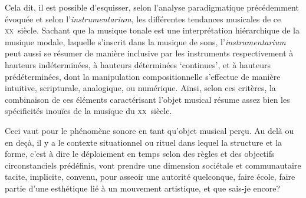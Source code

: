\documentclass{article}
\begin{document}
Cela dit, il est possible d'esquisser, selon l'analyse paradigmatique précédemment évoquée et selon l'\textit{instrumentarium}, les différentes tendances musicales de ce \textsc{xx}\ieme ~siècle.
 Sachant que la musique tonale est une interprétation hiérarchique de la musique modale, laquelle s'inscrit dans la musique de sons, l'\textit{instrumentarium} peut aussi se résumer de manière inclusive par les instruments respectivement  %
 à hauteurs indéterminées, à hauteurs déterminées `continues', et à hauteurs prédéterminées, 
 dont la manipulation compositionnelle s'effectue de manière intuitive, scripturale, analogique, ou numérique. 
 Ainsi, selon ces critères, la combinaison de ces éléments caractérisant l'objet musical résume assez bien les spécificités inouïes de la musique du \textsc{xx}\ieme ~siècle. 
 
 Ceci vaut pour le phénomène sonore en tant qu'objet musical perçu. Au delà ou en deçà, il y a  le contexte situationnel ou rituel dans lequel la structure et la forme, c'est à dire le déploiement en temps selon des règles et des objectifs circonstanciels prédéfinis, vont prendre une dimension sociétale et communautaire %
tacite, implicite, convenu, pour asseoir une autorité quelconque, faire école, faire partie d'une esthétique lié à un mouvement artistique, et que sais-je encore?  
\end{document}

